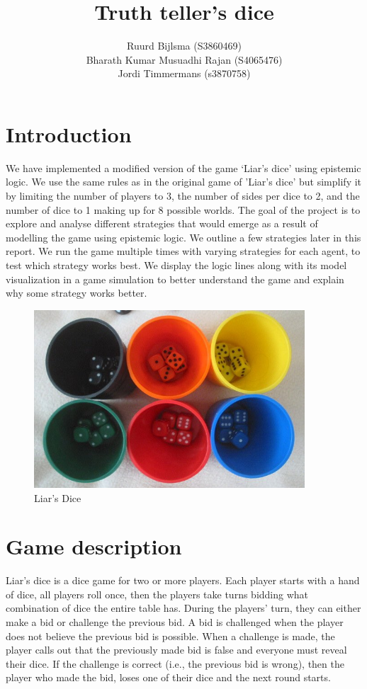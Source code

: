 \documentclass{article}
\title{Truth teller's dice}
\author{Ruurd Bijlsma (S3860469) \\
Bharath Kumar Musuadhi Rajan (S4065476) \\
Jordi Timmermans (s3870758)
}
\begin{document}
\maketitle

\section*{Introduction}

We have implemented a modified version of the game ‘Liar’s dice’ using epistemic logic. We use the same rules as in the original game of 'Liar's dice' but simplify it by limiting the number of players to 3, the number of sides per dice to 2, and the number of dice to 1 making up for 8 possible worlds. The goal of the project is to explore and analyse different strategies that would emerge as a result of modelling the game using epistemic logic. We outline a few strategies later in this report. We run the game multiple times with varying strategies for each agent, to test which strategy works best. We display the logic lines along with its model visualization in a game simulation to better understand the game and explain why some strategy works better.

\begin{figure}[h]
    \includegraphics[width=0.9\textwidth]{img/Er3haXVXEAYrp0r.jpg}
    \centering
    \caption{Liar's Dice}
    \label{fig:liarsdice}
\end{figure}

\section*{Game description}
Liar's dice is a dice game for two or more players. Each player starts with a hand of dice, all players roll once, then the players take turns bidding what combination of dice the entire table has. During the players’ turn, they can either make a bid or challenge the previous bid. A bid is challenged when the player does not believe the previous bid is possible. When a challenge is made, the player calls out that the previously made bid is false and everyone must reveal their dice. If the challenge is correct (i.e., the previous bid is wrong), then the player who made the bid, loses one of their dice and the next round starts.
\end{document}
